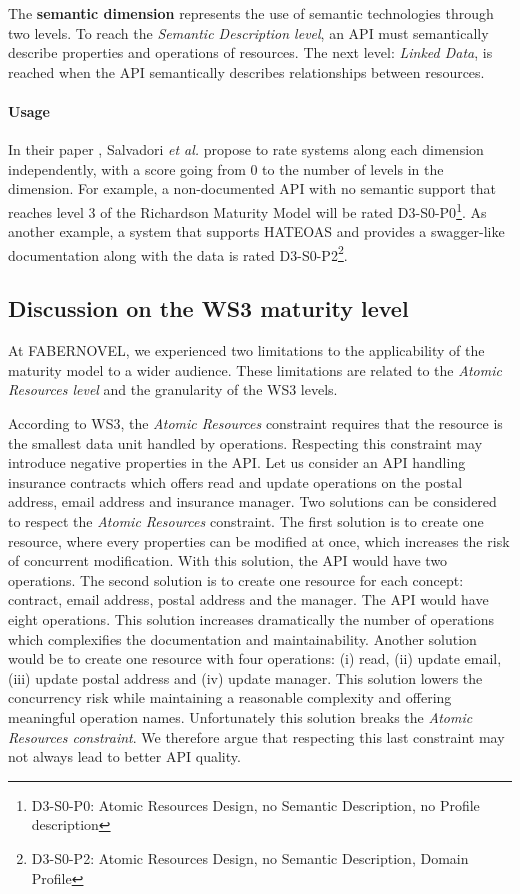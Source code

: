 The \textbf{semantic dimension} represents the use of semantic technologies through two levels. To reach the \textit{Semantic Description level}, an API must semantically describe properties and operations of resources. The next level: \textit{Linked Data}, is reached when the API semantically describes relationships between resources.

\paragraph{Usage}
In their paper \cite{7195633}, Salvadori \emph{et al.} propose to rate systems along each dimension independently, with a score going from 0 to the number of levels in the dimension.
For example, a non-documented API with no semantic support that reaches level 3 of the Richardson Maturity Model will be rated D3-S0-P0\footnote{D3-S0-P0: Atomic Resources Design, no Semantic Description, no Profile description}. As another example, a system that supports HATEOAS and provides a swagger-like documentation along with the data is rated D3-S0-P2\footnote{D3-S0-P2: Atomic Resources Design, no Semantic Description, Domain Profile}.

\vspace*{-0.5cm}

\subsection{Discussion on the WS3 maturity level}


At FABERNOVEL, we experienced two limitations to the applicability of the maturity model to a wider audience. These limitations are related to the \textit{Atomic Resources level} and the granularity of the WS3 levels.

According to WS3, the \textit{Atomic Resources} constraint requires that the resource is the smallest data unit handled by operations.
Respecting this constraint may introduce negative properties in the API.
Let us consider an API handling insurance contracts which offers read and update operations on the postal address, email address and insurance manager. 
Two solutions can be considered to respect the \textit{Atomic Resources} constraint. 
The first solution is to create one resource, where every properties can be modified at once, which increases the risk of concurrent modification. 
With this solution, the API would have two operations. 
The second solution is to create one resource for each concept: contract, email address, postal address and the manager. The API would have eight operations. This solution increases dramatically the number of operations which complexifies the documentation and maintainability.
Another solution would be to create one resource with four operations: (i) read, (ii) update email, (iii) update postal address and (iv) update manager. 
This solution lowers the concurrency risk while maintaining a reasonable complexity and offering meaningful operation names. Unfortunately this solution breaks the \textit{Atomic Resources constraint}. We therefore argue that respecting this last constraint may not always lead to better API quality.

